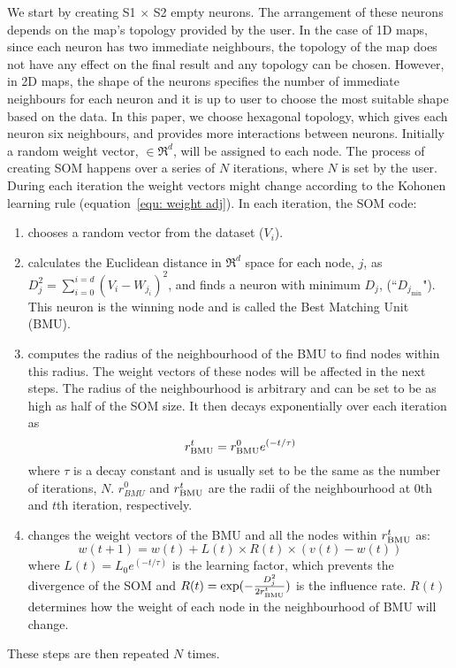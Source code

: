      We start by creating S1 $\times$ S2 empty neurons. 
     The arrangement of these neurons depends on the map's topology provided by the user. 
     In the case of 1D maps, since each neuron has two immediate neighbours, the topology of the map does not have any effect on the final result and any topology can be chosen.
     However, in 2D maps, the shape of the neurons specifies the number of immediate neighbours for each neuron and it is up to user to choose the most suitable shape based on the data.
     In this paper, we choose hexagonal topology, which gives each neuron six neighbours, and provides more interactions between neurons.
     Initially a random weight vector,  $\in \Re^d$, will be assigned to each node.
     The process of creating SOM happens over a series of $N$ iterations, where $N$ is set by the user. 
     During each iteration the weight vectors might change according to the Kohonen learning rule (equation~\ref{equ: weight adj}). 
      In each iteration, the SOM code:
     \begin{enumerate}
        \item chooses a random vector from the dataset ($V_i$).
        \item calculates the Euclidean distance in $\Re^d$ space for each node, $j$, as  $D_j^2= \sum_{i=0}^{i=d} (V_i - W_{j_i})^2$, and finds a neuron with minimum $D_j$, (``$D_{j_{\min}}$"). This neuron is the winning node and is called the Best Matching Unit (BMU). 
        \item  computes the radius of the neighbourhood of the BMU to find nodes within this radius. The weight vectors of these nodes will be affected in the next steps. The radius of the neighbourhood is arbitrary and can be set to be as high as half of the SOM size. It then decays exponentially over each iteration as
        \begin{equation}
            r^t_{\rm BMU} = r^0_{\rm BMU}e^{(-t/\tau)}
        \end{equation}
        where $\tau$ is a decay constant and is usually set to be the same as the number of iterations, $N$. $r^0_{BMU}$ and $r^t_{\rm BMU}$ are the radii of the neighbourhood at 0th and $t$th iteration, respectively. 
        \item changes the weight vectors of the BMU and all the nodes within $r^t_{\rm BMU}$ as:
        \begin{equation}
            \label{equ: weight adj}
            w(t+1)=w(t)+L(t) \times R(t) \times(v(t)-w(t))
        \end{equation}
        where $L(t) = L_0 e^{(-t/\tau)}$ is the learning factor, which prevents the divergence of the SOM and $R(t)=\exp(-\frac{D_j^2}{2r^t_{\rm BMU}})$ is the influence rate. $R(t)$ determines how the weight of each node in the neighbourhood of BMU will change.
     \end{enumerate}
     These steps are then repeated $N$ times.
     
